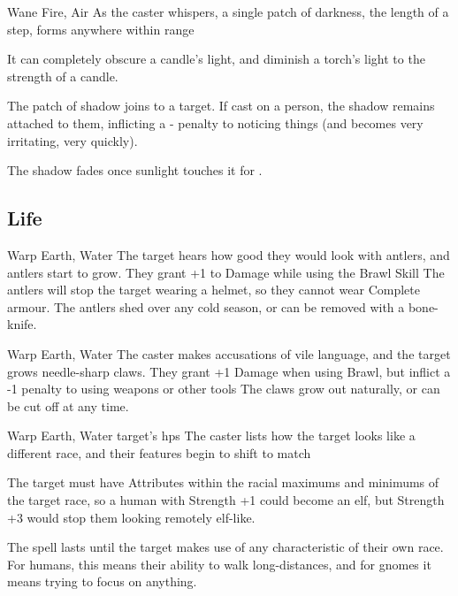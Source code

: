 \begin{multicols}{2}
  {}%
  {Wane}%
  {Fire, Air}%
  {}%
  {As the caster whispers, a single patch of darkness, the length of a step, forms anywhere within range}%
  {It can completely obscure a candle's light, and diminish a torch's light to the strength of a candle.

    The patch of shadow joins to a target.
    If cast on a person, the shadow remains attached to them, inflicting a - penalty to noticing things (and becomes very irritating, very quickly).

    The shadow fades once sunlight touches it for .}

\subsection{Life}


  {}%
  {Warp}%
  {Earth, Water}%
  {}%
  {The target hears how good they would look with antlers, and antlers start to grow.
  They grant +1 to Damage while using the Brawl Skill}%
  {
  The antlers will stop the target wearing a helmet, so they cannot wear Complete armour.
  The antlers shed over any cold season, or can be removed with a bone-knife.}

  {}%
  {Warp}%
  {Earth, Water}%
  {}%
  {The caster makes accusations of vile language, and the target grows needle-sharp claws.
  They grant +1 Damage when using Brawl, but inflict a -1 penalty to using weapons or other tools}%
  {
  The claws grow out naturally, or can be cut off at any time.}

  {}%
  {Warp}%
  {Earth, Water}%
  {target's \glspl{hp}}%
  {The caster lists how the target looks like a different race, and their features begin to shift to match}%
  {The target must have Attributes within the racial maximums and minimums of the target race, so a human with Strength +1 could become an elf, but Strength +3 would stop them looking remotely elf-like.

  The spell lasts until the target makes use of any characteristic of their own race.
  For humans, this means their ability to walk long-distances, and for gnomes it means trying to focus on anything.}


\end{multicols}
